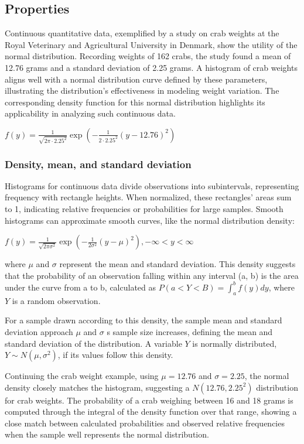 \documentclass{article}
\begin{document}
\subsection{Properties}

Continuous quantitative data, exemplified by a study on crab weights at the Royal Veterinary and Agricultural University in Denmark, show the utility of the normal distribution. Recording weights of 162 crabs, the study found a mean of 12.76 grams and a standard deviation of 2.25 grams. A histogram of crab weights aligns well with a normal distribution curve defined by these parameters, illustrating the distribution's effectiveness in modeling weight variation. The corresponding density function for this normal distribution highlights its applicability in analyzing such continuous data.

$f(y)= \frac {1} {\sqrt{2 \pi \cdot 2.25^2}} \exp (-\frac {1} {2 \cdot 2.25^2} (y-12.76)^2)$

\subsubsection{Density, mean, and standard deviation}

Histograms for continuous data divide observations into subintervals, representing frequency with rectangle heights. When normalized, these rectangles' areas sum to 1, indicating relative frequencies or probabilities for large samples. Smooth histograms can approximate smooth curves, like the normal distribution density:

$f(y) = \frac {1} {\sqrt{2 \pi \sigma ^2}} \exp (- \frac {1} {2 \sigma ^2} (y-\mu)^2 ), -\infty < y < \infty$

where $\mu$ and $\sigma$ represent the mean and standard deviation. This density suggests that the probability of an observation falling within any interval (a, b) is the area under the curve from a to b, calculated as $P(a<Y<B)= \int_a^b f(y) dy$, where $Y$ is a random observation.

For a sample drawn according to this density, the sample mean and standard deviation approach $\mu$ and $\sigma$ s sample size increases, defining the mean and standard deviation of the distribution. A variable $Y$ is normally distributed, $Y \sim N(\mu, \sigma ^2)$, if its values follow this density.

Continuing the crab weight example, using $\mu = 12.76$ and $\sigma=2.25$, the normal density closely matches the histogram, suggesting a $N(12.76, 2.25^2)$ distribution for crab weights. The probability of a crab weighing between 16 and 18 grams is computed through the integral of the density function over that range, showing a close match between calculated probabilities and observed relative frequencies when the sample well represents the normal distribution.
\end{document}
